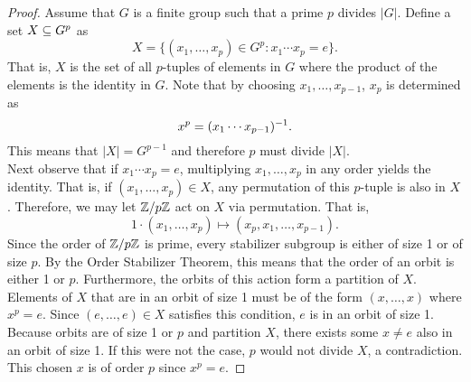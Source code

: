 \documentclass[../../AlgebraQualSolutions.tex]{subfiles}
\begin{document}
        \begin{proof}
        Assume that $G$ is a finite group such that a prime $p$ divides $|G|$. Define a set $X \subseteq G^p$ as
            \[X = \{(x_1, \ldots, x_p) \in G^p: x_1 \cdots x_p = e\}. \]
        That is, $X$ is the set of all $p$-tuples of elements in $G$ where the product of the elements is the identity in $G$. Note that by choosing $x_1, \ldots, x_{p-1}$, $x_p$ is determined as
            \[x^p = (x_1 \cdots x_{p - 1})^{-1}. \]
        This means that $|X| = G^{p-1}$ and therefore $p$ must divide $|X|$.\\
        
        Next observe that if $x_1 \cdots x_p = e$, multiplying $x_1, \ldots, x_p$ in any order yields the identity. That is, if $(x_1, \ldots, x_p) \in X$, any permutation of this $p$-tuple is also in $X$. Therefore, we may let $\mathbb{Z} / p\mathbb{Z}$ act on $X$ via permutation. That is,
            \[1 \cdot (x_1, \ldots, x_p) \mapsto (x_p, x_1, \ldots, x_{p-1}). \]
        Since the order of $\mathbb{Z} / p\mathbb{Z}$ is prime, every stabilizer subgroup is either of size 1 or of size $p$. By the Order Stabilizer Theorem, this means that the order of an orbit is either 1 or $p$. Furthermore, the orbits of this action form a partition of $X$. Elements of $X$ that are in an orbit of size 1 must be of the form $(x, \ldots, x)$ where $x^p = e$. Since $(e, \ldots, e) \in X$ satisfies this condition, $e$ is in an orbit of size 1. Because orbits are of size 1 or $p$ and partition $X$, there exists some $x \neq e$ also in an orbit of size 1. If this were not the case, $p$ would not divide $X$, a contradiction. This chosen $x$ is of order $p$ since $x^p = e$.
        \end{proof}
        
\end{document}
